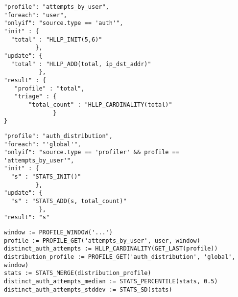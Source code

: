 \documentclass[aspectratio=169]{beamer}
\begin{document}
\begin{frame}[fragile]
\begin{verbatim}
"profile": "attempts_by_user",
"foreach": "user",
"onlyif": "source.type == 'auth'",
"init" : {
  "total" : "HLLP_INIT(5,6)"
         },
"update": {
  "total" : "HLLP_ADD(total, ip_dst_addr)"
          },
"result" : {
   "profile" : "total",
   "triage" : {
       "total_count" : "HLLP_CARDINALITY(total)"
              }
}
\end{verbatim}
\end{frame}

\begin{frame}[fragile]
\begin{verbatim}
"profile": "auth_distribution",
"foreach": "'global'",
"onlyif": "source.type == 'profiler' && profile == 'attempts_by_user'",
"init" : {
  "s" : "STATS_INIT()"
         },
"update": {
  "s" : "STATS_ADD(s, total_count)"
          },
"result": "s"
\end{verbatim}
\end{frame}

\begin{frame}[fragile]
\begin{verbatim}
window := PROFILE_WINDOW('...')
profile := PROFILE_GET('attempts_by_user', user, window)
distinct_auth_attempts := HLLP_CARDINALITY(GET_LAST(profile))
distribution_profile := PROFILE_GET('auth_distribution', 'global', window)
stats := STATS_MERGE(distribution_profile)
distinct_auth_attempts_median := STATS_PERCENTILE(stats, 0.5)
distinct_auth_attempts_stddev := STATS_SD(stats)
\end{verbatim}
\end{frame}

\end{document}
